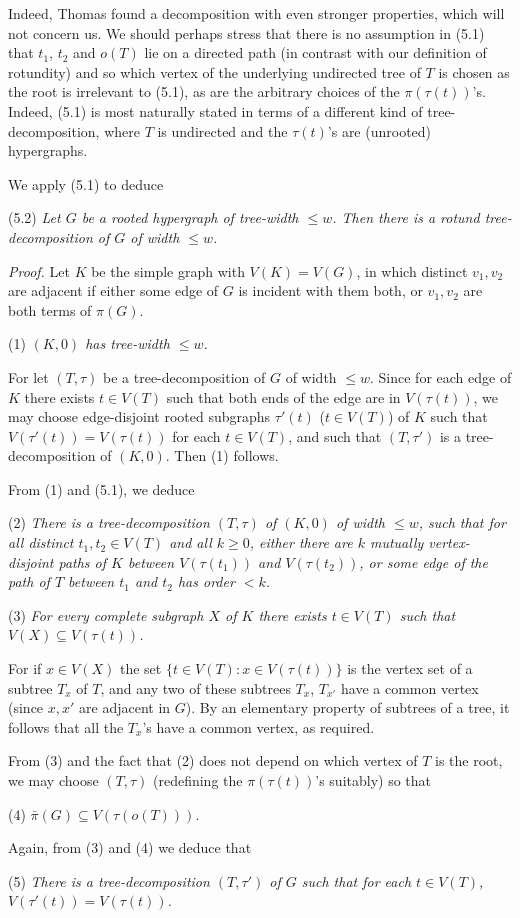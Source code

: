 Indeed, Thomas found a decomposition with even stronger properties, which will not concern us. We should perhaps stress that there is no assumption in (5.1) that $t_1$, $t_2$ and $o(T)$ lie on a directed path (in contrast with our definition of rotundity) and so which vertex of the underlying undirected tree of $T$ is chosen as the root is irrelevant to (5.1), as are the arbitrary choices of the $\pi(\tau(t))$'s. Indeed, (5.1) is most naturally stated in terms of a different kind of tree-decomposition, where $T$ is undirected and the $\tau(t)$'s are (unrooted) hypergraphs.

We apply (5.1) to deduce

\stmt
(5.2) \textit{Let $G$ be a rooted hypergraph of tree-width $\le w$. Then there is a rotund tree-decomposition of $G$ of width $\le w$.}

\textit{Proof.} Let $K$ be the simple graph with $V(K) = V(G)$, in which distinct $v_1, v_2$ are adjacent if either some edge of $G$ is incident with them both, or $v_1, v_2$ are both terms of $\pi(G)$.

\hspace*{12pt}(1) \textit{$(K, 0)$ has tree-width $\le w$.}

For let $(T, \tau)$ be a tree-decomposition of $G$ of width $\le w$. Since for each edge of $K$ there exists $t \in V(T)$ such that both ends of the edge are in $V(\tau(t))$, we may choose edge-disjoint rooted subgraphs $\tau'(t)$ ($t \in V(T)$) of $K$ such that $V(\tau'(t)) = V(\tau(t))$ for each $t \in V(T)$, and such that $(T, \tau')$ is a tree-decomposition of $(K, 0)$. Then (1) follows.

From (1) and (5.1), we deduce

\hspace*{12pt}(2) \textit{There is a tree-decomposition $(T, \tau)$ of $(K, 0)$ of width $\le w$, such that for all distinct $t_1, t_2 \in V(T)$ and all $k \ge 0$, either there are $k$ mutually vertex-disjoint paths of $K$ between $V(\tau(t_1))$ and $V(\tau(t_2))$, or some edge of the path of $T$ between $t_1$ and $t_2$ has order $< k$.}

\hspace*{12pt}(3) \textit{For every complete subgraph $X$ of $K$ there exists $t \in V(T)$ such that $V(X) \subseteq V(\tau(t))$.}

For if $x \in V(X)$ the set $\{t \in V(T): x \in V(\tau(t))\}$ is the vertex set of a subtree $T_x$ of $T$, and any two of these subtrees $T_x$, $T_{x'}$ have a common vertex (since $x, x'$ are adjacent in $G$). By an elementary property of subtrees of a tree, it follows that all the $T_x$'s have a common vertex, as required.

From (3) and the fact that (2) does not depend on which vertex of $T$ is the root, we may choose $(T, \tau)$ (redefining the $\pi(\tau(t))$'s suitably) so that

\hspace*{12pt}(4) $\bar{\pi}(G) \subseteq V(\tau(o(T)))$.

Again, from (3) and (4) we deduce that

\hspace*{12pt}(5) \textit{There is a tree-decomposition $(T, \tau')$ of $G$ such that for each $t \in V(T)$, $V(\tau'(t)) = V(\tau(t))$.}
